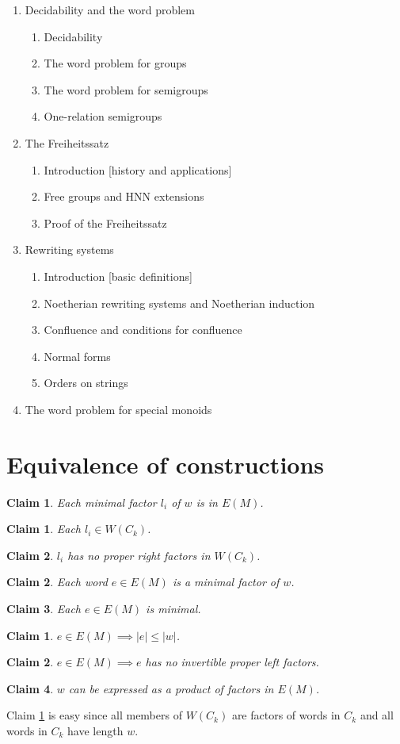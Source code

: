 \documentclass[noinsetproof,widepage,11pt,libertine]{lmaths}
\newtheorem{claim}{Claim}
\newtheorem{subclaim}{Claim}[claim]
\newtheorem{subsubclaim}{Claim}[subclaim]
\begin{document}
\begin{enumerate}
	\item
		Decidability and the word problem
		\begin{enumerate}
			\item Decidability
			\item The word problem for groups
			\item The word problem for semigroups
			\item One-relation semigroups
		\end{enumerate}
	\item
		The Freiheitssatz
		\begin{enumerate}
			\item Introduction [history and applications]
			\item Free groups and HNN extensions
			\item Proof of the Freiheitssatz
		\end{enumerate}
	\item
		Rewriting systems
		\begin{enumerate}
			\item Introduction [basic definitions]
			\item Noetherian rewriting systems and Noetherian induction
			\item Confluence and conditions for confluence
			\item Normal forms
			\item Orders on strings
		\end{enumerate}
	\item
		The word problem for special monoids
\end{enumerate}

\clearpage
\section*{Equivalence of constructions}

\begin{claim} Each minimal factor $l_i$ of $w$ is in $E(M)$. \end{claim}
	\begin{subclaim} Each $l_i \in W(C_k)$. \end{subclaim}
	\begin{subclaim} $l_i$ has no proper right factors in $W(C_k)$. \end{subclaim}
\begin{claim} Each word $e \in E(M)$ is a minimal factor of $w$. \end{claim}
	\begin{subclaim} Each $e \in E(M)$ is minimal. \end{subclaim}
		\begin{subsubclaim} $e \in E(M) \implies |e| \le |w|$. \label{sc:e-short} \end{subsubclaim}
		\begin{subsubclaim} $e \in E(M) \implies e$ has no invertible proper left factors. \end{subsubclaim}
	\begin{subclaim} $w$ can be expressed as a product of factors in $E(M)$. \end{subclaim}


Claim \ref{sc:e-short} is easy since all members of $W(C_k)$ are factors of words in $C_k$ and all words in $C_k$ have length $w$.
\end{document}
